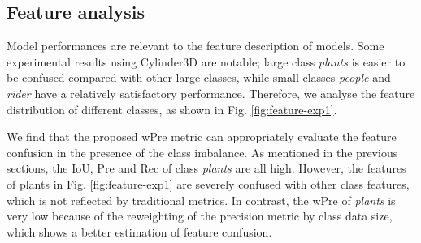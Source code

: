 \documentclass[journal]{IEEEtran}
\begin{document}


\subsection{Feature analysis}


Model performances are relevant to the feature description of models. Some experimental results using Cylinder3D are notable; large class \textit{plants} is easier to be confused compared with other large classes, while small classes \textit{people} and \textit{rider} have a relatively satisfactory performance. Therefore, we analyse the feature distribution of different classes, as shown in Fig. \ref{fig:feature-exp1}. 

We find that the proposed wPre metric can appropriately evaluate the feature confusion in the presence of the class imbalance. As mentioned in the previous sections, the IoU, Pre and Rec of class \textit{plants} are all high. However, the features of plants in Fig. \ref{fig:feature-exp1} are severely confused with other class features, which is not reflected by traditional metrics. In contrast, the wPre of \textit{plants} is very low because of the reweighting of the precision metric by class data size, which shows a better estimation of feature confusion.
\end{document}
